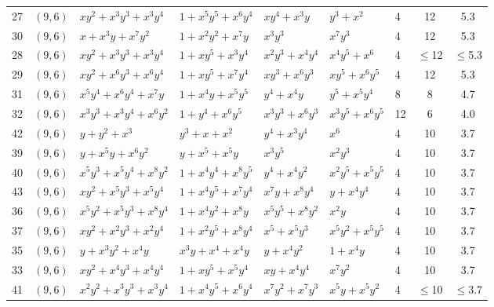\begin{table}[t]
\begin{tabular*}{\textwidth}{@{\extracolsep{\fill}}cllllllcc}
27 & $(9,6)$ & $xy^{2}{+}x^{3}y^{3}{+}x^{3}y^{4}$ & $1{+}x^{5}y^{5}{+}x^{6}y^{4}$ & $xy^{4}{+}x^{3}y$ & $y^{3}{+}x^{2}$ & 4 & 12 & 5.3 \\
30 & $(9,6)$ & $x{+}x^{3}y{+}x^{7}y^{2}$ & $1{+}x^{2}y^{2}{+}x^{7}y$ & $x^{3}y^{3}$ & $x^{7}y^{3}$ & 4 & 12 & 5.3 \\
28 & $(9,6)$ & $xy^{2}{+}x^{3}y^{3}{+}x^{3}y^{4}$ & $1{+}xy^{5}{+}x^{3}y^{4}$ & $x^{2}y^{3}{+}x^{4}y^{4}$ & $x^{4}y^{5}{+}x^{6}$ & 4 & $\leq$12 & $\leq$5.3 \\
29 & $(9,6)$ & $xy^{2}{+}x^{6}y^{3}{+}x^{6}y^{4}$ & $1{+}xy^{5}{+}x^{7}y^{4}$ & $xy^{3}{+}x^{6}y^{3}$ & $xy^{5}{+}x^{6}y^{5}$ & 4 & 12 & 5.3 \\
31 & $(9,6)$ & $x^{5}y^{4}{+}x^{6}y^{4}{+}x^{7}y$ & $1{+}x^{4}y{+}x^{5}y^{5}$ & $y^{4}{+}x^{4}y$ & $y^{5}{+}x^{5}y^{4}$ & 8 & 8 & 4.7 \\
32 & $(9,6)$ & $x^{3}y^{3}{+}x^{3}y^{4}{+}x^{6}y^{2}$ & $1{+}y^{4}{+}x^{6}y^{5}$ & $x^{3}y^{3}{+}x^{6}y^{3}$ & $x^{3}y^{5}{+}x^{6}y^{5}$ & 12 & 6 & 4.0 \\
42 & $(9,6)$ & $y{+}y^{2}{+}x^{3}$ & $y^{3}{+}x{+}x^{2}$ & $y^{4}{+}x^{3}y^{4}$ & $x^{6}$ & 4 & 10 & 3.7 \\
39 & $(9,6)$ & $y{+}x^{5}y{+}x^{6}y^{2}$ & $y{+}x^{5}{+}x^{5}y$ & $x^{3}y^{5}$ & $x^{2}y^{3}$ & 4 & 10 & 3.7 \\
40 & $(9,6)$ & $x^{5}y^{3}{+}x^{5}y^{4}{+}x^{8}y^{2}$ & $1{+}x^{4}y^{4}{+}x^{8}y^{5}$ & $y^{4}{+}x^{4}y^{2}$ & $x^{2}y^{5}{+}x^{5}y^{5}$ & 4 & 10 & 3.7 \\
43 & $(9,6)$ & $xy^{2}{+}x^{5}y^{3}{+}x^{5}y^{4}$ & $1{+}x^{4}y^{5}{+}x^{7}y^{4}$ & $x^{7}y{+}x^{8}y^{4}$ & $y{+}x^{4}y^{4}$ & 4 & 10 & 3.7 \\
36 & $(9,6)$ & $x^{5}y^{2}{+}x^{5}y^{3}{+}x^{8}y^{4}$ & $1{+}x^{4}y^{2}{+}x^{8}y$ & $x^{5}y^{5}{+}x^{8}y^{2}$ & $x^{2}y$ & 4 & 10 & 3.7 \\
37 & $(9,6)$ & $xy^{2}{+}x^{2}y^{3}{+}x^{2}y^{4}$ & $1{+}x^{2}y^{5}{+}x^{8}y^{4}$ & $x^{5}{+}x^{5}y^{3}$ & $x^{5}y^{2}{+}x^{5}y^{5}$ & 4 & 10 & 3.7 \\
35 & $(9,6)$ & $y{+}x^{3}y^{2}{+}x^{4}y$ & $x^{3}y{+}x^{4}{+}x^{4}y$ & $y{+}x^{4}y^{2}$ & $1{+}x^{4}y$ & 4 & 10 & 3.7 \\
33 & $(9,6)$ & $xy^{2}{+}x^{4}y^{3}{+}x^{4}y^{4}$ & $1{+}xy^{5}{+}x^{5}y^{4}$ & $xy{+}x^{4}y^{4}$ & $x^{7}y^{2}$ & 4 & 10 & 3.7 \\
41 & $(9,6)$ & $x^{2}y^{2}{+}x^{3}y^{3}{+}x^{3}y^{4}$ & $1{+}x^{4}y^{5}{+}x^{6}y^{4}$ & $x^{7}y^{2}{+}x^{7}y^{3}$ & $x^{5}y{+}x^{5}y^{2}$ & 4 & $\leq$10 & $\leq$3.7 \\

\end{tabular*}
\end{table}
